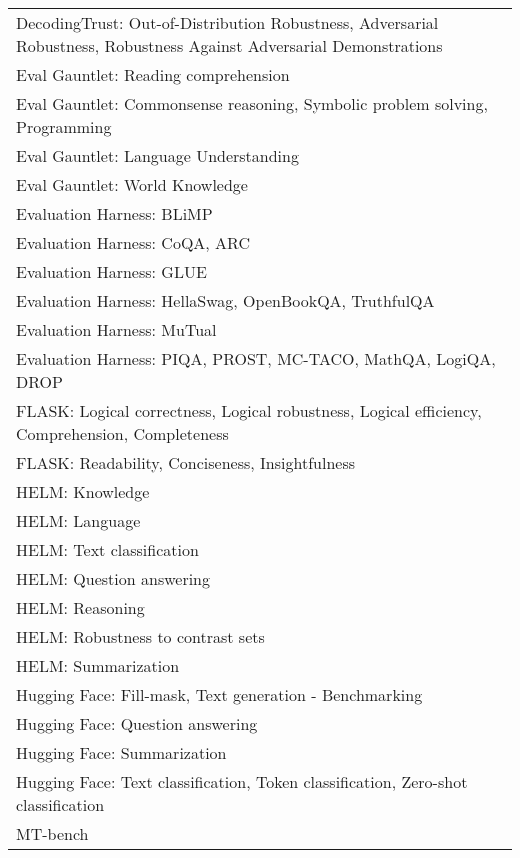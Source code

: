 \documentclass[fleqn]{article}
\begin{document}
\begin{table}[H]
\begin{tabular}{l}
		DecodingTrust: Out-of-Distribution Robustness, Adversarial Robustness, 			Robustness Against Adversarial Demonstrations\\
		Eval Gauntlet: Reading comprehension \\
		Eval Gauntlet: Commonsense reasoning, Symbolic problem solving, Programming \\
		Eval Gauntlet: Language Understanding  \\
		Eval Gauntlet: World Knowledge \\
		Evaluation Harness: BLiMP \\
		Evaluation Harness: CoQA, ARC \\
		Evaluation Harness: GLUE \\
		Evaluation Harness: HellaSwag, OpenBookQA, TruthfulQA \\
		Evaluation Harness: MuTual \\
		Evaluation Harness: PIQA, PROST, MC-TACO, MathQA, LogiQA, DROP \\
		FLASK: Logical correctness, Logical robustness, Logical efficiency, Comprehension, Completeness \\
		FLASK: Readability, Conciseness, Insightfulness \\
		HELM: Knowledge \\
		HELM: Language \\
		HELM: Text classification \\
		HELM: Question answering \\
		HELM: Reasoning \\
		HELM: Robustness to contrast sets \\
		HELM: Summarization \\
		Hugging Face: Fill-mask, Text generation - Benchmarking \\
		Hugging Face: Question answering \\
		Hugging Face: Summarization \\
		Hugging Face: Text classification, Token classification, Zero-shot classification \\
		MT-bench \\
		\bottomrule
	\end{tabular}	
\end{table}	

\end{document}
